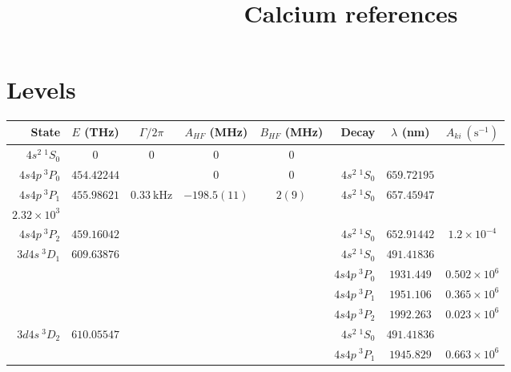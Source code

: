 \documentclass[aps,prx,10pt]{revtex4-2}
\begin{document}
\title{Calcium references}

\maketitle

\section{Levels}
\renewcommand*{\arraystretch}{1.4}
\begin{longtable}{|r|c|c|c|c|r|c|c|}
\hline
State&$E$ (THz)&$\Gamma/2\pi$&$A_{HF}$ (MHz)&$B_{HF}$ (MHz)&Decay&$\lambda$ (nm)&$A_{ki}\ \mathrm{(s^{-1})}$\\
\hline
$4s^2\ {}^{\mathrm{1}}\!S_0$&$0$&$0$&$0$&$0$&&&\\
\hline
$4s4p\ {}^{\mathrm{3}}\!P_0$&$454.42244$&&$0$&$0$&$4s^2\ {}^{\mathrm{1}}\!S_0$&$659.72195$&\\
\hline
$4s4p\ {}^{\mathrm{3}}\!P_1$&$455.98621$&$0.33\ \mathrm{kHz}$\cite{machholmCalculationsPhys.Rev.A2001}&$-198.5(11)$\cite{klingbeilIsotopeZPhysikA1979}&$2(9)$\cite{klingbeilIsotopeZPhysikA1979}&$4s^2\ {}^{\mathrm{1}}\!S_0$&$657.45947$&\shortstack{$2.1\times10^3$\cite{machholmCalculationsPhys.Rev.A2001}\\$2.32\times10^3$\cite{vogtCreation2009}}\\
\hline
$4s4p\ {}^{\mathrm{3}}\!P_2$&$459.16042$&&&&$4s^2\ {}^{\mathrm{1}}\!S_0$&$652.91442$&$1.2\times10^{-4}$\cite{vogtCreation2009}\\
\hline
\multirow{4}{*}{$3d4s\ {}^{\mathrm{3}}\!D_1$}&\multirow{4}{*}{$609.63876$}&\multirow{4}{*}{}&\multirow{4}{*}{}&\multirow{4}{*}{}&$4s^2\ {}^{\mathrm{1}}\!S_0$&$491.41836$&\\
\cline{6-8}
&&&&&$4s4p\ {}^{\mathrm{3}}\!P_0$&$1931.449$&$0.502\times10^{6}$\cite{zhouMagicPhys.Rev.A2010}\\
\cline{6-8}
&&&&&$4s4p\ {}^{\mathrm{3}}\!P_1$&$1951.106$&$0.365\times10^{6}$\cite{zhouMagicPhys.Rev.A2010}\\
\cline{6-8}
&&&&&$4s4p\ {}^{\mathrm{3}}\!P_2$&$1992.263$&$0.023\times10^{6}$\cite{zhouMagicPhys.Rev.A2010}\\
\hline
\multirow{3}{*}{$3d4s\ {}^{\mathrm{3}}\!D_2$}&\multirow{3}{*}{$610.05547$}&\multirow{3}{*}{}&\multirow{3}{*}{}&\multirow{3}{*}{}
&$4s^2\ {}^{\mathrm{1}}\!S_0$&$491.41836$&\\
\cline{6-8}
&&&&&$4s4p\ {}^{\mathrm{3}}\!P_1$&$1945.829$&$0.663\times10^{6}$\cite{zhouMagicPhys.Rev.A2010}\\

\end{longtable}
\end{document}
